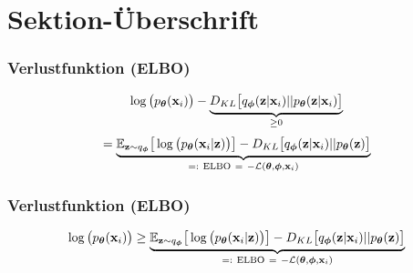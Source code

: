 

\author[Sebastian Hahn]{Nix}


\beamertemplatenavigationsymbolsempty{}



\section{Sektion-Überschrift}

\begin{frame}
	\frametitle{Verlustfunktion (ELBO)}
	\begin{align*}
	\log\big(p_{\boldsymbol\theta}(\mathbf{x}_i)\big) - \underbrace{D_{KL}\big[q_{\boldsymbol\phi}(\mathbf{z}|\mathbf{x}_i) || p_{\boldsymbol\theta}(\mathbf{z}|\mathbf{x}_i)\big]}_{\ge 0}
	\end{align*}
	\begin{align*}
	 =\underbrace{ \E_{\z\sim q_{\boldsymbol\phi}}\big[\log\big(\pdec\big)\big] - D_{KL}\big[\qenc||p_{\boldsymbol\theta}(\z)\big]}_{=:\ \mathrm{ELBO}\ =\ -\mathcal{L}(\boldsymbol\theta,\boldsymbol\phi,\mathbf{x}_i)}
	\end{align*}
\end{frame}

\begin{frame}
	\frametitle{Verlustfunktion (ELBO)}
	\begin{align*}
	\log\big(p_{\boldsymbol\theta}(\x)\big)
	\geq\underbrace{ \E_{\z\sim q_{\boldsymbol\phi}}\big[\log\big(\pdec\big)\big] - D_{KL}\big[\qenc||p_{\boldsymbol\theta}(\z)\big]}_{=:\ \mathrm{ELBO}\ =\ -\mathcal{L}(\boldsymbol\theta,\boldsymbol\phi,\mathbf{x}_i)}
	\end{align*}
\end{frame}

